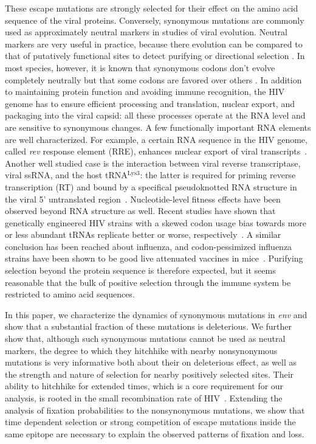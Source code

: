 \documentclass[rmp, twocolumn]{revtex4}
\newcommand{\rev}{\textit{rev}}
\newcommand{\env}{\textit{env}}
\begin{document}
These escape mutations are strongly selected for their effect on the amino acid
sequence of the viral proteins. Conversely, synonymous mutations are commonly
used as approximately neutral markers in studies of viral evolution. Neutral
markers are very useful in practice, because there evolution can be compared to
that of putatively functional sites to detect purifying or directional selection
\citep{Bhatt:2011p43255,Hurst:2002p32608,Chen:2004p22606}. In most species,
however, it is  known that synonymous codons don't evolve completely neutrally
but that some codons are favored over others \citep{plotkin_synonymous_2011}.
In addition to maintaining protein function and avoiding immune
recognition, the HIV genome has to ensure efficient processing and translation,
nuclear export, and packaging into the viral capsid: all these processes operate at the RNA
level and are sensitive to synonymous changes. A few functionally important RNA
elements are well characterized. For example, a certain RNA sequence in the HIV
genome, called \rev{} response element (RRE), enhances nuclear export of viral
transcripts~\citep{fernandes_hiv-1_2012}. Another well studied case is the
interaction between viral reverse transcriptase, viral ssRNA, and the host
tRNA$^\text{Lys3}$: the latter is required for priming reverse transcription
(RT) and bound by a specifical pseudoknotted RNA structure in the viral 5'
untranslated region~\citep{barat_interaction_1991, paillart_vitro_2002}.
Nucleotide-level fitness effects have been observed beyond RNA structure as
well. Recent studies have shown that genetically engineered HIV strains with
a skewed codon usage bias towards more or less abundant tRNAs
replicate better or worse, respectively~\citep{ngumbela_quantitative_2008,
li_codon-usage-based_2012}. A similar conclusion has been reached about
influenza, and codon-pessimized influenza strains have been shown to be good
live attenuated vaccines in mice~\citep{mueller_live_2010}. Purifying selection
beyond the protein sequence is therefore expected, but it seems reasonable
that the bulk of positive selection through the immune system be restricted to
amino acid sequences.


In this paper, we characterize the dynamics of synonymous mutations in \env{}
and show that a substantial fraction of these mutations is deleterious. We
further show that, although such synonymous mutations cannot be used as neutral
markers, the degree to which they hitchhike with nearby nonsynonymous mutations
is very informative both about their on deleterious effect, as well as the
strength and nature of selection for nearby positively selected sites.
Their ability to hitchhike for extended times, which is a core requirement for
our analysis, is rooted in the small recombination rate of
HIV~\citep{neher_recombination_2010, batorsky_estimate_2011}. Extending the
analysis of fixation probabilities to the nonsynonymous mutations, we show that
time dependent selection or strong competition of escape mutations inside the
same epitope are necessary to explain the observed patterns of fixation and
loss.
\end{document}
